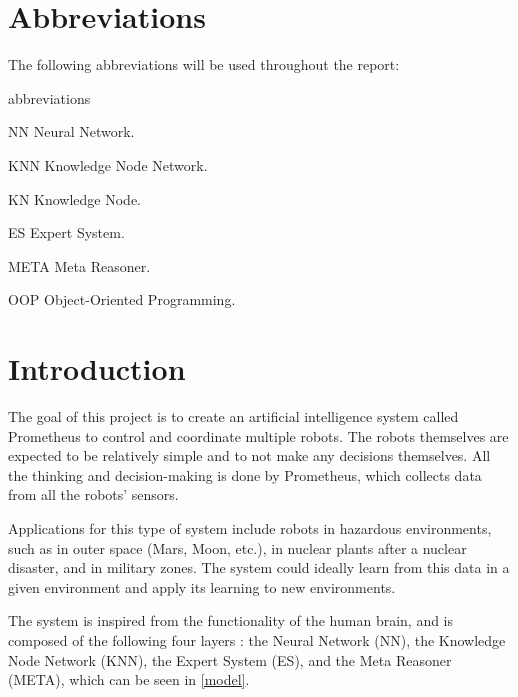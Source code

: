 \documentclass[titlepage,11pt]{article}
\begin{document}
\clearpage
\tableofcontents

\listoffigures
\listoftables
\lstlistoflistings
\clearpage

\twocolumn

\section*{Abbreviations}

The following abbreviations will be used throughout the report:

\begin{labeling}{abbreviations}
\item [NN] Neural Network.
\item [KNN] Knowledge Node Network.
\item [KN] Knowledge Node.
\item [ES] Expert System.
\item [META] Meta Reasoner.
\item [OOP] Object-Oriented Programming.
\end{labeling}

\section{Introduction} \label{sec:intro}

The goal of this project is to create an artificial intelligence system called Prometheus to control and coordinate multiple robots. The robots themselves are expected to be relatively simple and to not make any decisions themselves. All the thinking and decision-making is done by Prometheus, which collects data from all the robots' sensors.

Applications for this type of system include robots in hazardous environments, such as in outer space (Mars, Moon, etc.), in nuclear plants after a nuclear disaster, and in military zones.  The system could ideally learn from this data in a given environment and apply its learning to new environments.

The system is inspired from the functionality of the human brain, and is composed of the following four layers \cite{vybihal-model}: the Neural Network (NN), the Knowledge Node Network (KNN), the Expert System (ES), and the Meta Reasoner (META), which can be seen in \autoref{model}.
\end{document}
